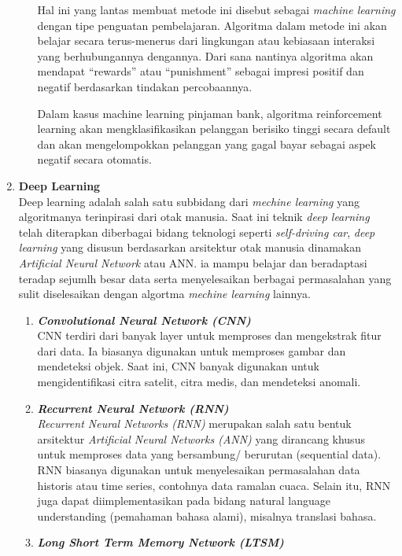 \begin{enumerate}
\begin{enumerate}[nolistsep]
        Hal ini yang lantas membuat metode ini disebut sebagai \textit{machine learning} dengan tipe penguatan pembelajaran. Algoritma dalam metode ini akan belajar secara terus-menerus dari lingkungan atau kebiasaan interaksi yang berhubungannya dengannya. Dari sana nantinya algoritma akan mendapat “rewards” atau “punishment” sebagai impresi positif dan negatif berdasarkan tindakan percobaannya.
      
        Dalam kasus machine learning pinjaman bank, algoritma reinforcement learning akan mengklasifikasikan pelanggan berisiko tinggi secara default dan akan mengelompokkan pelanggan yang gagal bayar sebagai aspek negatif secara otomatis.  
    \end{enumerate}
  \item \textbf{Deep Learning} \\ 
    Deep learning adalah salah satu subbidang dari \textit{mechine learning} yang algoritmanya terinpirasi dari otak manusia. Saat ini teknik \textit{deep learning} telah diterapkan diberbagai bidang teknologi seperti \textit{self-driving car}, \textit{deep learning} yang disusun berdasarkan arsitektur otak manusia dinamakan \textit{Artificial Neural Network} atau ANN. ia mampu belajar dan beradaptasi teradap sejumlh besar data serta menyelesaikan berbagai permasalahan yang sulit diselesaikan dengan algortma \textit{mechine learning} lainnya. 
    \begin{enumerate}[nolistsep]
      \item \textbf{\textit{Convolutional Neural Network (CNN)}}\\
        CNN terdiri dari banyak layer untuk memproses dan mengekstrak fitur dari data. Ia biasanya digunakan untuk memproses gambar dan mendeteksi objek. Saat ini, CNN banyak digunakan untuk mengidentifikasi citra satelit, citra medis, dan mendeteksi anomali.
      \item \textbf{\textit{Recurrent Neural Network (RNN)}}\\
        \textit{Recurrent Neural Networks (RNN)} merupakan salah satu bentuk arsitektur \textit{Artificial Neural Networks (ANN)} yang dirancang khusus untuk memproses data yang bersambung/ berurutan (sequential data). RNN biasanya digunakan untuk menyelesaikan permasalahan data historis atau time series, contohnya data ramalan cuaca. Selain itu, RNN juga dapat diimplementasikan pada bidang natural language understanding (pemahaman bahasa alami), misalnya  translasi bahasa.
      \item \textbf{\textit{{Long Short Term Memory Network (LTSM)}}}
    \end{enumerate}
  
\end{enumerate}

